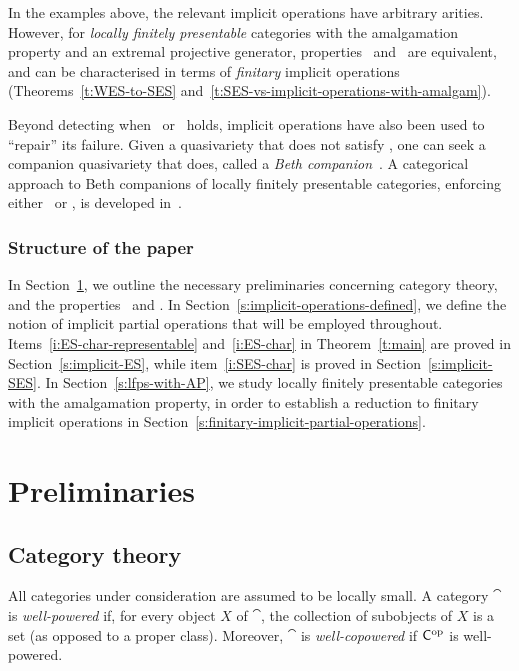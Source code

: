 \documentclass[a4paper,10pt,reqno]{amsart}
\theoremstyle{definition}
\theoremstyle{remark}
\begin{document}
In the examples above, the relevant implicit operations have arbitrary arities. However, for \emph{locally finitely presentable} categories with the amalgamation property and an extremal projective generator, properties \ES~and \SES~are equivalent, and can be characterised in terms of \emph{finitary} implicit operations (Theorems~\ref{t:WES-to-SES} and~\ref{t:SES-vs-implicit-operations-with-amalgam}).

\medskip
Beyond detecting when \ES~or \SES~holds, implicit operations have also been used to ``repair'' its failure. Given a quasivariety that does not satisfy \SES, one can seek a companion quasivariety that does, called a \emph{Beth companion}~\cite{CKM2026}. A categorical approach to Beth companions of locally finitely presentable categories, enforcing either \ES~or \SES, is developed in~\cite{DLR2026}.

\subsubsection*{Structure of the paper} In Section~\ref{s:preliminaries}, we outline the necessary preliminaries concerning category theory, and the properties \ES~and \SES. In Section~\ref{s:implicit-operations-defined}, we define the notion of implicit partial operations that will be employed throughout. Items~\ref{i:ES-char-representable} and~\ref{i:ES-char} in Theorem~\ref{t:main} are proved in Section~\ref{s:implicit-ES}, while item~\ref{i:SES-char} is proved in Section~\ref{s:implicit-SES}. In Section~\ref{s:lfps-with-AP}, we study locally finitely presentable categories with the amalgamation property, in order to establish a reduction to finitary implicit operations in Section~\ref{s:finitary-implicit-partial-operations}.


\section{Preliminaries}\label{s:preliminaries}

\subsection{Category theory}\label{s:category-theory}
All categories under consideration are assumed to be locally small.
%
A category $\cat$ is \emph{well-powered} if, for every object $X$ of $\cat$, the collection of subobjects of $X$ is a set (as opposed to a proper class). Moreover, $\cat$ is \emph{well-copowered} if ${\sf C}^{{\mathrm{op}}}$ is well-powered.
\end{document}
